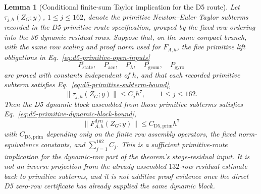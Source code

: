 \documentclass[preprint,12pt]{elsarticle}
\newtheorem{lemma}{Lemma}
\begin{document}
\begin{lemma}[Conditional finite-sum Taylor implication for the D5 route]
\label{lem:d5-conditional-taylor-finite-sum}
Let \(\tau_{j,h}(Z_G;y)\), \(1\le j\le 162\), denote the primitive
Newton--Euler Taylor subterms recorded in the D5 primitive-route
specification, grouped by
the fixed row ordering into the 36 dynamic residual rows.  Suppose that, on
the same compact branch, with the same row scaling and proof norm used for
\(F_{A,h}\), the five primitive lift obligations in
Eq.~\eqref{eq:d5-primitive-open-inputs}
\begin{equation}
\label{eq:d5-primitive-open-inputs}
P_{\mathrm{state}},\quad P_{\mathrm{acc}},\quad P_{\lambda},\quad
P_{\mathrm{geom}},\quad P_{\mathrm{gyro}}
\end{equation}
are proved with constants independent of \(h\), and that each recorded
primitive subterm satisfies Eq.~\eqref{eq:d5-primitive-subterm-bound},
\begin{equation}
\label{eq:d5-primitive-subterm-bound}
  \|\tau_{j,h}(Z_G;y)\|\le C_jh^7,\qquad 1\le j\le 162 .
\end{equation}
Then the D5 dynamic block assembled from those primitive subterms satisfies
Eq.~\eqref{eq:d5-primitive-dynamic-block-bound},
\begin{equation}
\label{eq:d5-primitive-dynamic-block-bound}
  \|F^{\mathrm{dyn}}_{A,h}(Z_G;y)\|
  \le C_{\mathrm{D5},\mathrm{prim}}h^7
\end{equation}
with \(C_{\mathrm{D5},\mathrm{prim}}\) depending only on the finite row
assembly operators, the fixed norm-equivalence constants, and
\(\sum_{j=1}^{162} C_j\).  This is a sufficient primitive-route implication
for the dynamic-row part of the theorem's stage-residual input.  It is not an inverse
projection from the already assembled \(132\)-row residual estimate back to
primitive subterms, and it is not additive proof evidence once the direct D5
zero-row certificate has already supplied the same dynamic block.
\end{lemma}
\end{document}
